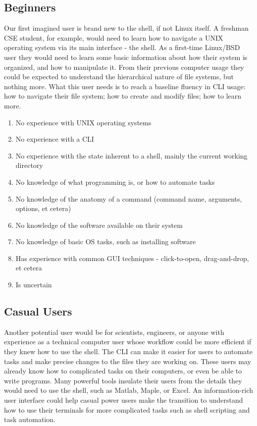 \subsection{Beginners}
Our first imagined user is brand new to the shell, if not Linux itself. A
freshman CSE student, for example, would need to learn how to navigate a UNIX
operating system via its main interface - the shell. As a first-time Linux/BSD
user they would need to learn some basic information about how their system is
organized, and how to manipulate it. From their previous computer usage they
could be expected to understand the hierarchical nature of file systems, but
nothing more. What this user needs is to reach a baseline fluency in CLI usage:
how to navigate their file system; how to create and modify files; how to learn
more.
\begin{enumerate}
  \item No experience with UNIX operating systems
  \item No experience with a CLI
  \item No experience with the state inherent to a shell, mainly the current working directory
  \item No knowledge of what programming is, or how to automate tasks
  \item No knowledge of the anatomy of a command (command name, arguments, options, et cetera)
  \item No knowledge of the software available on their system
  \item No knowledge of basic OS tasks, such as installing software
  \item Has experience with common GUI techniques - click-to-open, drag-and-drop, et cetera
  \item Is uncertain
\end{enumerate}
\subsection{Casual Users}
Another potential user would be for scientists, engineers, or anyone with
experience as a technical computer user whose workflow could be more efficient
if they knew how to use the shell. The CLI can make it easier for users to
automate tasks and make precise changes to the files they are working on. These
users may already know how to complicated tasks on their computers, or even be
able to write programs. Many powerful tools insulate their users from the
details they would need to use the shell, such as Matlab, Maple, or Excel. An
information-rich user interface could help casual power users make the
transition to understand how to use their terminals for more complicated tasks
such as shell scripting and task automation.

